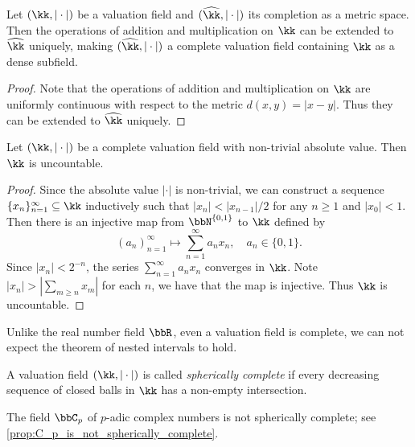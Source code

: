     \begin{lemma}\label{lem:completion_of_valuation_field}
        Let \((\kk,|\cdot|)\) be a valuation field and \((\widehat{\kk},|\cdot|)\) its completion as a metric space.
        Then the operations of addition and multiplication on \(\kk\) can be extended to \(\widehat{\kk}\) uniquely, making \((\widehat{\kk},|\cdot|)\) a complete valuation field containing \(\kk\) as a dense subfield.
    \end{lemma}
    \begin{proof}
        Note that the operations of addition and multiplication on \(\kk\) are uniformly continuous with respect to the metric \(d(x,y) = |x - y|\).
        Thus they can be extended to \(\widehat{\kk}\) uniquely.
    \end{proof}

    \begin{proposition}\label{prop:non-trivial_complete_field_is_uncountable}
        Let \((\kk,|\cdot|)\) be a complete valuation field with non-trivial absolute value.
        Then \(\kk\) is uncountable.
    \end{proposition}
    \begin{proof}
        Since the absolute value \(|\cdot|\) is non-trivial, we can construct a sequence \(\{x_n\}_{n=1}^\infty \subseteq \kk\) inductively such that \(|x_n| < |x_{n-1}|/2\) for any \(n\geq 1\) and \(|x_0| < 1\).
        Then there is an injective map from \(\bbN^{\{0,1\}}\) to \(\kk\) defined by
        \[ (a_n)_{n=1}^\infty \mapsto \sum_{n=1}^\infty a_n x_n, \quad a_n \in \{0,1\}. \]
        Since \(|x_n| < 2^{-n}\), the series \(\sum_{n=1}^\infty a_n x_n\) converges in \(\kk\).
        Note \(|x_n| > |\sum_{m\geq n} x_m|\) for each \(n\), we have that the map is injective.
        Thus \(\kk\) is uncountable.
    \end{proof}

    Unlike the real number field \(\bbR\), even a valuation field is complete, we can not expect the theorem of nested intervals to hold.

    \begin{definition}\label{def:spherically_complete}
        A valuation field \((\kk,|\cdot|)\) is called \emph{spherically complete} if every decreasing sequence of closed balls in \(\kk\) has a non-empty intersection.
    \end{definition}

    \begin{example}\label{eg:p-adic_complex_field_is_not_spherically_complete}
        The field \(\bbC_p\) of \(p\)-adic complex numbers is not spherically complete; see \cref{prop:C_p_is_not_spherically_complete}.
    \end{example}

